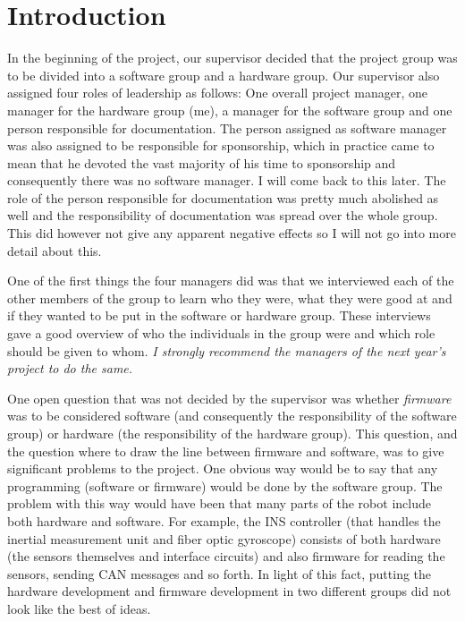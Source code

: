 
\section{Introduction}\label{sec:introduction}
In the beginning of the project, our supervisor decided that the project group was to be divided into a software group and a hardware group. Our supervisor also assigned four roles of leadership as follows: One overall project manager, one manager for the hardware group (me), a manager for the software group and one person responsible for documentation. \newline
The person assigned as software manager was also assigned to be responsible for sponsorship, which in practice came to mean that he devoted the vast majority of his time to sponsorship and consequently there was no software manager. I will come back to this later. \newline
The role of the person responsible for documentation was pretty much abolished as well and the responsibility of documentation was spread over the whole group. This did however not give any apparent negative effects so I will not go into more detail about this.

One of the first things the four managers did was that we interviewed each of the other members of the group to learn who they were, what they were good at and if they wanted to be put in the software or hardware group. These interviews gave a good overview of who the individuals in the group were and which role should be given to whom. \emph{I strongly recommend the managers of the next year's project to do the same.}

One open question that was not decided by the supervisor was whether \emph{firmware} was to be considered software (and consequently the responsibility of the software group) or hardware (the responsibility of the hardware group). This question, and the question where to draw the line between firmware and software, was to give significant problems to the project. \newline
One obvious way would be to say that any programming (software or firmware) would be done by the software group. The problem with this way would have been that many parts of the robot include both hardware and software. For example, the INS controller (that handles the inertial measurement unit and fiber optic gyroscope) consists of both hardware (the sensors themselves and interface circuits) and also firmware for reading the sensors, sending CAN messages and so forth. In light of this fact, putting the hardware development and firmware development in two different groups did not look like the best of ideas.


